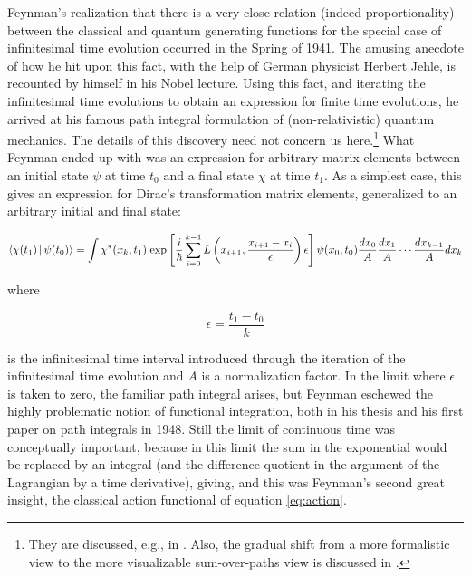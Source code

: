 \documentclass[12pt]{article}
\begin{document}
Feynman's realization that there is a very close relation (indeed proportionality) between the classical and quantum generating functions for the special case of infinitesimal time evolution occurred in the Spring of 1941. The amusing anecdote of how he hit upon this fact, with the help of German physicist Herbert Jehle, is recounted by himself in his Nobel lecture. Using this fact, and iterating the infinitesimal time evolutions to obtain an expression for finite time evolutions, he arrived at his famous path integral formulation of (non-relativistic) quantum mechanics. The details of this discovery need not concern us here.\footnote{They are discussed, e.g., in \citep{wuethrich_2010_the-genesis}. Also, the gradual shift from a more formalistic view to the more visualizable sum-over-paths view is discussed in \citep{schweber_1986_feynman}.} What Feynman ended up with was an expression for arbitrary matrix elements between an initial state $\psi$ at time $t_0$ and a final state $\chi$ at time $t_1$. As a simplest case, this gives an expression for Dirac's transformation matrix elements, generalized to an arbitrary initial and final state:

\begin{equation}
\label{eq:amplitude}
\Braket{\chi (t_1) | \psi (t_0)} =   \int  \chi^{\ast} (x_k, t_1) \; \mathrm{exp}\left[ \frac{i}{\hbar} \sum_{i=0}^{k-1} L \left( x_{i+1}, \frac{x_{i+1}-x_i}{\epsilon} \right) \epsilon \right] \psi (x_0, t_0) \frac{dx_0}{A} \frac{dx_1}{A} \cdots \frac{dx_{k-1}}{A} dx_k
\end{equation} 


where

\begin{equation}
\epsilon = \frac{t_1 - t_0}{k}
\end{equation}

is the infinitesimal time interval introduced through the iteration of the infinitesimal time evolution and $A$ is a normalization factor. In the limit where $\epsilon$ is taken to zero, the familiar path integral arises, but Feynman eschewed the highly problematic notion of functional integration, both in his thesis and his first paper on path integrals in 1948. Still the limit of continuous time was conceptually important, because in this limit the sum in the exponential would be replaced by an integral (and the difference quotient in the argument of the Lagrangian by a time derivative), giving, and this was Feynman's second great insight, the classical action functional of equation \ref{eq:action}.
\end{document}
